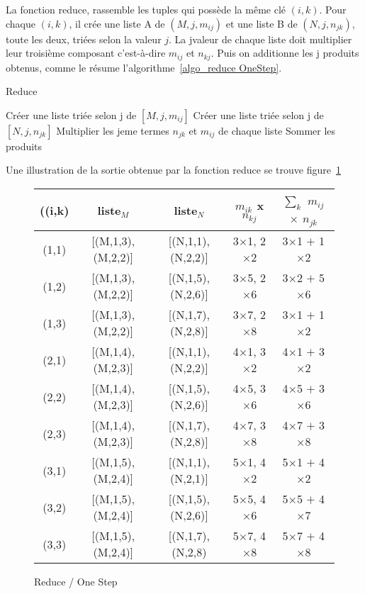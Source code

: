 \littlesectionspace
La fonction reduce, rassemble les tuples qui possède la même clé $(i,k)$. Pour chaque $(i,k)$, il crée une liste A de $(M,j,m_{ij})$ et une liste B de $(N,j,n_{jk})$,
toute les deux, triées selon la valeur $j$. La j\ieme valeur de chaque liste doit multiplier leur troisième composant c'est-à-dire $m_{ij}$ et $n_{kj}$. Puis on additionne
les j produits obtenus, comme le résume l'algorithme~\ref{algo_reduce OneStep}.   
\begin{algorithm}[H]
  \caption{Reduce}
  \label{algo_reduce OneStep}
  \begin{algorithmic}
    \State Cr\'{e}er une liste triée selon j de $[M,j,m_{ij}]$
    \State Cr\'{e}er une liste triée selon j de $[N,j,n_{jk}]$
    \EndFor
    \State Multiplier les jeme termes $n_{jk}$ et $m_{ij}$ de chaque liste
    \State Sommer les produits
  \end{algorithmic}
\end{algorithm}

\littlesectionspace
Une illustration de la sortie obtenue par la fonction reduce se trouve figure~\ref{reduce_one_step}
\begin{figure}[H]
  \begin{center}
    \begin{tabular}{|c|c|c|c|c|}
      \hline
	  ((i,k) & liste$_{M}$ & liste$_{N}$ &  $m_{ik}$ x $n_{kj}$ & $\sum_{k}$ $m_{ij}$ $\times$ $n_{jk}$ \\
      \hline
      (1,1) & [(M,1,3),(M,2,2)] & [(N,1,1),(N,2,2)] & 3$\times$1, 2$\times$2 & 3$\times$1 $+$ 1$\times$2 \\
      (1,2) & [(M,1,3),(M,2,2)] & [(N,1,5),(N,2,6)] & 3$\times$5, 2$\times$6 & 3$\times$2 $+$ 5$\times$6 \\
      (1,3) & [(M,1,3),(M,2,2)] & [(N,1,7),(N,2,8)] & 3$\times$7, 2$\times$8 & 3$\times$1 $+$ 1$\times$2 \\
      (2,1) & [(M,1,4),(M,2,3)] & [(N,1,1),(N,2,2)] & 4$\times$1, 3$\times$2 & 4$\times$1 $+$ 3$\times$2 \\
      (2,2) & [(M,1,4),(M,2,3)] & [(N,1,5),(N,2,6)] & 4$\times$5, 3$\times$6 & 4$\times$5 $+$ 3$\times$6 \\
      (2,3) & [(M,1,4),(M,2,3)] & [(N,1,7),(N,2,8)] & 4$\times$7, 3$\times$8 & 4$\times$7 $+$ 3$\times$8 \\
      (3,1) & [(M,1,5),(M,2,4)] & [(N,1,1),(N,2,1)] & 5$\times$1, 4$\times$2 & 5$\times$1 $+$ 4$\times$2 \\
      (3,2) & [(M,1,5),(M,2,4)] & [(N,1,5),(N,2,6)] & 5$\times$5, 4$\times$6 & 5$\times$5 $+$ 4$\times$7 \\
      (3,3) & [(M,1,5),(M,2,4)] & [(N,1,7), (N,2,8) & 5$\times$7, 4$\times$8 & 5$\times$7 $+$ 4$\times$8 \\           
      \hline
    \end{tabular}
    \caption{Reduce / One Step}
    \label{reduce_one_step}
  \end{center}
\end{figure}
